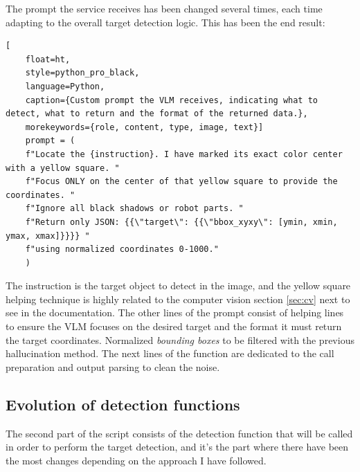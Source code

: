 The prompt the service receives has been changed several times, each time adapting to the overall target detection logic. This has been the end result: 

\begin{lstlisting}[
	float=ht,
	style=python_pro_black,
	language=Python, 
	caption={Custom prompt the VLM receives, indicating what to detect, what to return and the format of the returned data.},
	morekeywords={role, content, type, image, text}]
	prompt = (
	f"Locate the {instruction}. I have marked its exact color center with a yellow square. "
	f"Focus ONLY on the center of that yellow square to provide the coordinates. "
	f"Ignore all black shadows or robot parts. "
	f"Return only JSON: {{\"target\": {{\"bbox_xyxy\": [ymin, xmin, ymax, xmax]}}}} "
	f"using normalized coordinates 0-1000."
	)
\end{lstlisting}

The instruction is the target object to detect in the image, and the yellow square helping technique is highly related to the computer vision section \ref{sec:cv} next to see in the documentation. The other lines of the prompt consist of helping lines to ensure the VLM focuses on the desired target and the format it must return the target coordinates. Normalized \textit{bounding boxes} to be filtered with the previous hallucination method. The next lines of the function are dedicated to the call preparation and output parsing to clean the noise.

\subsection{Evolution of detection functions}
The second part of the script consists of the detection function that will be called in order to perform the target detection, and it's the part where there have been the most changes depending on the approach I have followed. 

